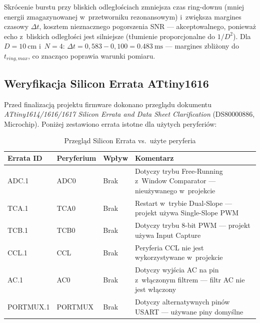 \documentclass[a4paper,11pt]{article}
\begin{document}
	Skrócenie burstu przy bliskich odległościach zmniejsza czas ring-downu
	(mniej energii zmagazynowanej w~przetworniku rezonansowym) i~zwiększa
	margines czasowy $\Delta t$, kosztem nieznacznego pogorszenia SNR ---
	akceptowalnego, ponieważ echo z~bliskich odległości jest silniejsze
	(tłumienie proporcjonalne do $1/D^2$). Dla $D = \SI{10}{\centi\metre}$
	i~$N = 4$: $\Delta t = 0{,}583 - 0{,}100 = \SI{0,483}{\milli\second}$
	--- margines zbliżony do $t_{ring,max}$, co znacząco poprawia warunki
	pomiaru.
	
	
	\subsection{Weryfikacja Silicon Errata ATtiny1616}
	\label{sec:errata}
	
	Przed finalizacją projektu firmware dokonano przeglądu dokumentu
	\textit{ATtiny1614/1616/1617 Silicon Errata and Data Sheet Clarification}
	(DS80000886, Microchip). Poniżej zestawiono errata istotne dla użytych
	peryferiów:
	
	\begin{table}[H]
		\centering
		\caption{Przegląd Silicon Errata vs.\ użyte peryferia}
		\label{tab:errata}
		\begin{tabularx}{\textwidth}{l l l X}
			\toprule
			\textbf{Errata ID} & \textbf{Peryferium} & \textbf{Wpływ} & \textbf{Komentarz} \\
			\midrule
			ADC.1  & ADC0   & Brak & Dotyczy trybu Free-Running z~Window Comparator --- nieużywanego w~projekcie \\
			TCA.1  & TCA0   & Brak & Restart w~trybie Dual-Slope --- projekt używa Single-Slope PWM \\
			TCB.1  & TCB0   & Brak & Dotyczy trybu 8-bit PWM --- projekt używa Input Capture \\
			CCL.1  & CCL    & Brak & Peryferia CCL nie jest wykorzystywane w~projekcie \\
			AC.1   & AC0    & Brak & Dotyczy wyjścia AC na pin z~włączonym filtrem --- filtr AC nie jest włączony \\
			PORTMUX.1 & PORTMUX & Brak & Dotyczy alternatywnych pinów USART --- używane piny domyślne \\
			\bottomrule
		\end{tabularx}
	\end{table}
	
\end{document}
